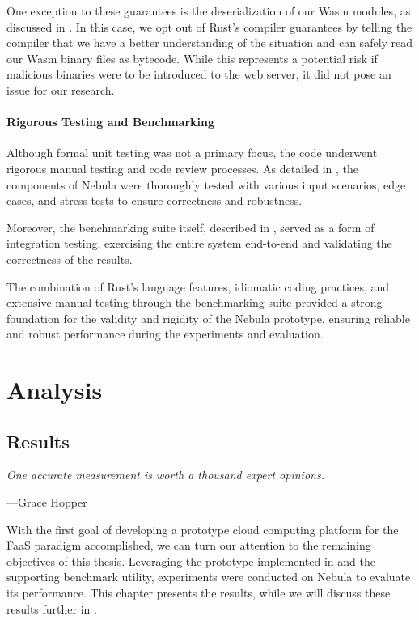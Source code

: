 \documentclass[
  table]{report}
\begin{document}
One exception to these guarantees is the deserialization of our
\ac{Wasm} modules, as discussed in . In
this case, we opt out of Rust's compiler guarantees by telling the
compiler that we have a better understanding of the situation and can
safely read our \ac{Wasm} binary files as bytecode. While this
represents a potential risk if malicious binaries were to be introduced
to the web server, it did not pose an issue for our research.

\subsection{Rigorous Testing and Benchmarking}

Although formal unit testing was not a primary focus, the code underwent
rigorous manual testing and code review processes. As detailed in
, the components of Nebula were thoroughly tested
with various input scenarios, edge cases, and stress tests to ensure
correctness and robustness.

Moreover, the benchmarking suite itself, described in
, served as a form of integration testing,
exercising the entire system end-to-end and validating the correctness
of the results.

The combination of Rust's language features, idiomatic coding practices,
and extensive manual testing through the benchmarking suite provided a
strong foundation for the validity and rigidity of the Nebula prototype,
ensuring reliable and robust performance during the experiments and
evaluation.

\part{Analysis}

\newpage
\chapter{Results}
\label{chap:results}

\setlength{} 
\epigraph{\itshape  
One accurate measurement is worth a thousand expert opinions.
}{---Grace Hopper}

With the first goal of developing a prototype cloud computing platform
for the \ac{FaaS} paradigm accomplished, we can turn our attention to
the remaining objectives of this thesis. Leveraging the prototype
implemented in  and the supporting benchmark
utility, experiments were conducted on Nebula to evaluate its
performance. This chapter presents the results, while we will discuss
these results further in .
\end{document}
